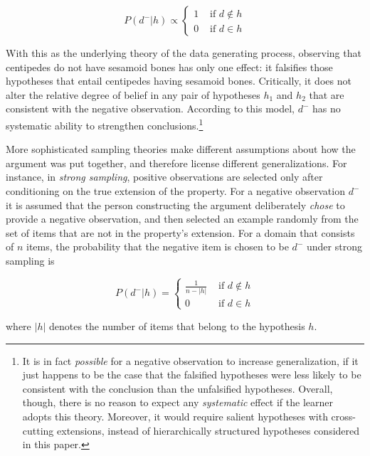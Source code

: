 \documentclass[authoryear,11pt]{elsarticle}
\begin{document}
\begin{equation}
P(d^- | h) \propto \left\{ \begin{array}{cl} 1 & \mbox{ if } d \notin h \\ 0 & \mbox{ if } d \in h \end{array} \right.
\label{eq:strong}
\end{equation}

With this as the underlying theory of the data generating process, observing that centipedes do not have sesamoid bones has only one effect: it falsifies those hypotheses that entail centipedes having sesamoid bones. Critically, it does not alter the relative degree of belief in any pair of hypotheses $h_1$ and $h_2$ that are  consistent with the negative observation. According to this model, $d^-$ has no systematic ability to strengthen conclusions.\footnote{It is in fact {\it possible} for a negative observation to increase generalization, if it just happens to be the case that the falsified hypotheses were less likely to be consistent with the conclusion than the unfalsified hypotheses. Overall, though, there is no reason to expect any {\it systematic} effect if the learner adopts this theory. Moreover, it would require salient hypotheses with cross-cutting extensions, instead of hierarchically structured hypotheses considered in this paper.}

More sophisticated sampling theories make different assumptions about how the argument was put together, and therefore license different generalizations. For instance, in {\it strong sampling}, positive observations are selected only after conditioning on the true extension of the property. For a negative observation $d^-$ it is assumed that the person constructing the argument deliberately {\it chose} to provide a negative observation, and then selected an example randomly from the set of items that are not in the property's extension. For a domain that consists of $n$ items, the probability that the negative item is chosen to be $d^-$ under strong sampling is

\begin{equation}
P(d^- | h) = \left\{ \begin{array}{cl} \frac{1}{n-|h|} & \mbox{ if } d \notin h \\ 0 & \mbox{ if } d \in h \end{array} \right.
\label{eq:negstrong}
\end{equation}

\noindent where $|h|$ denotes the number of items that belong to the hypothesis $h$.
\end{document}
